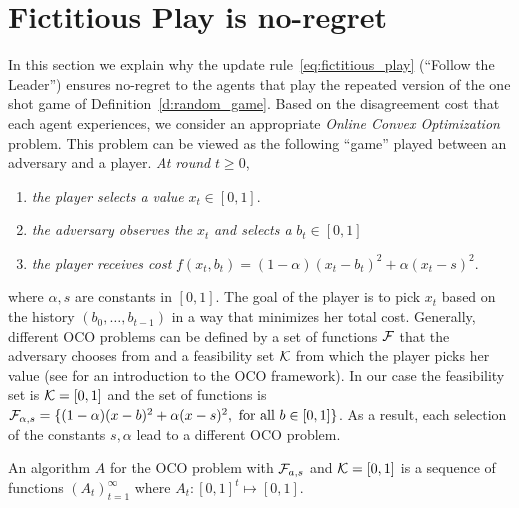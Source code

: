 \section{Fictitious Play is no-regret}\label{s:fictitious_noregret}

In this section we explain why the 
update rule~\ref{eq:fictitious_play} (\enquote{Follow the Leader}) ensures no-regret
to the agents that play the repeated version of the one shot 
game of Definition~\ref{d:random_game}. 
Based on the disagreement cost that each agent experiences, 
we consider an appropriate \emph{Online Convex Optimization} problem. 
This problem can be viewed as the following \enquote{game} played between an 
adversary and a player. \emph{At round }$t\geq 0$,
\begin{enumerate}
  \item \emph{the player selects a value }$x_t \in [0,1]$.
  \item \emph{the adversary observes the }$x_t$ \emph{and selects a} $b_t \in [0,1]$
  \item \emph{the player receives cost} $f(x_t,b_t)=(1-\alpha)(x_t-b_t)^2 + \alpha(x_t -s)^2$.
\end{enumerate}
where $\alpha,s$ are constants in $[0,1]$. The goal of 
the player is to pick $x_t$ based on the history
$(b_0,\ldots,b_{t-1})$ in a way that minimizes her total cost. 
Generally, different OCO problems can be defined by a set of functions
$\mathcal{F}$ that the adversary chooses from and a feasibility 
set $\mathcal{K}$ from which the player picks her value (see \cite{Haz16}
for an introduction to the OCO framework).
In our case the feasibility set is $\mathcal{K}=[0,1]$ and the set of functions is $\mathcal{F}_{\alpha,s} = \{(1-\alpha)(x-b)^2 + 
\alpha(x -s)^2,~\text{for all }b \in [0,1]\}$.
As a result, each selection of the 
constants $s,\alpha$ lead to a different OCO problem.

\begin{definition}\label{d:OCO_algo}
An algorithm $A$ for the OCO problem with $\mathcal{F}_{a,s}$ and
$\mathcal{K}=[0,1]$ is a sequence of functions $(A_t)_{t=1}^\infty$ where $A_t:[0,1]^t \mapsto [0,1]$.
\end{definition}

